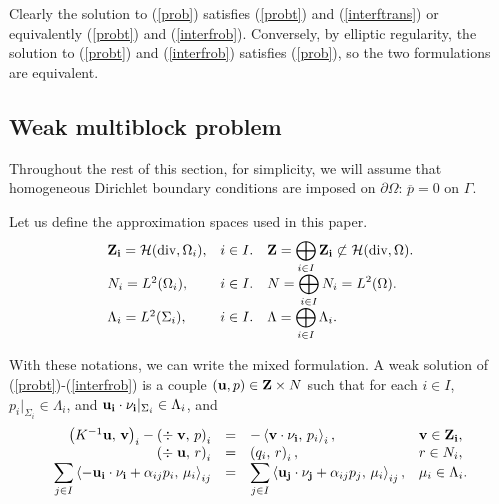 \documentclass{article}
\newcommand{\bral}{\left<}
\newcommand{\brar}{\right>}
\newcommand{\ovl}{\overline}
\newcommand{\dps}{\displaystyle}
\newcommand{\Hdiv}[1]{{\cal H}(\mbox{div},#1)}
\newcommand{\p}{\partial}
\begin{document}
Clearly the solution to (\ref{prob}) satisfies (\ref{probt}) and (\ref{interftrans}) or 
equivalently (\ref{probt}) and (\ref{interfrob}). Conversely, by elliptic regularity,
the solution to (\ref{probt}) and (\ref{interfrob}) satisfies (\ref{prob}), so the two 
formulations are equivalent.

\subsection{Weak multiblock problem}
Throughout the rest of this section, for simplicity, we will assume that
homogeneous Dirichlet boundary conditions are imposed on $\p \Omega$: 
$\ovl{p} = 0 \mbox{ on }\Gamma$.

Let us define the approximation spaces used in this paper.
\begin{equation}\begin{array}{lll}
  {\bf Z_i} = \Hdiv{\Omega_i},&i \in I. & 
{\bf Z} = \dps \bigoplus_{i \in I}  {\bf  Z_i} \not \subset \Hdiv{\Omega} . \\
  N_i = L^2(\Omega_i),&i \in I. & N = \dps \bigoplus_{i \in I} N_i =  L^2(\Omega). \\
  \Lambda_i = L^2(\Sigma_i),&i \in I. & \Lambda = \dps \bigoplus_{i \in I} \Lambda_i. \\
\end{array}\end{equation}

With these notations, we can write the mixed formulation. A weak solution 
of (\ref{probt})-(\ref{interfrob}) 
is a couple $({\bf u}, p) \in  {\bf Z} \times N$ such that for each 
$i \in I$, $p_i|_{\Sigma_i} \in \Lambda_i$, and
${\bf u_i \cdot \nu_i}|_{\Sigma_i}  \in \Lambda_i$, and 
 \begin{equation}\label{probtw}\begin{array}{rcll}
\left( K^{-1}{\bf u},\, {\bf v} \right)_{i} - 
\left( \div\; {\bf v}, \, p \right)_{i}  & = & \dps 
- \bral {\bf v \cdot  \nu_i} , \, p_{i} \brar_{i},  & {\bf v} \in {\bf Z_{i}}, \\
\left( \div\; {\bf u}, \, r \right)_{i} &= &
 \left(q_i, \, r \right)_{i},  & r \in N_{i},\\
\dps \sum_{j \in I} \bral - {\bf u_{i} \cdot  \nu_i}  + \alpha_{ij} p_i  , 
\, \mu_{i} \brar_{ij} & = & 
\dps \sum_{j \in I} \bral {\bf u_{j} \cdot  \nu_j}  + \alpha_{ij} p_j  , 
\, \mu_{i} \brar_{ij},  & \mu_{i} \in \Lambda_{i}.\\
\end{array}\end{equation}
\end{document}

